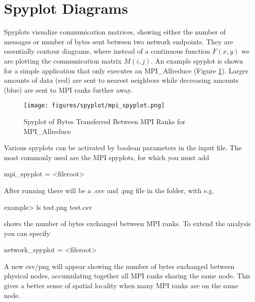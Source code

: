 

\section{Spyplot Diagrams}
\label{sec:tutorials:spyplot}

Spyplots visualize communication matrices, showing either the number of messages or number of bytes sent between two network endpoints.
They are essentially contour diagrams, where instead of a continuous function $F(x,y)$ we are plotting the communication matrix $M(i,j)$.
An example spyplot is shown for a simple application that only executes an MPI\_Allreduce (Figure \ref{fig:spyplot}).
Larger amounts of data (red) are sent to nearest neighbors while decreasing amounts (blue) are sent to MPI ranks further away.

\begin{figure}[h]
\centering
\texttt{[image: figures/spyplot/mpi\_spyplot.png]}
\caption{Spyplot of Bytes Transferred Between MPI Ranks for MPI\_Allreduce}
\label{fig:spyplot}
\end{figure}

Various spyplots can be activated by boolean parameters in the input file.
The most commonly used are the MPI spyplots, for which you must add

\begin{ViFile}
mpi_spyplot = <fileroot>
\end{ViFile}

After running there will be a .csv and .png file in the folder, with e.g. 

\begin{ShellCmd}
example> ls 
test.png
test.csv
\end{ShellCmd}
 shows the number of bytes exchanged between MPI ranks.
To extend the analysis you can specify

\begin{ViFile}
network_spyplot = <fileroot>
\end{ViFile}
A new csv/png will appear showing the number of bytes exchanged between physical nodes, 
accumulating together all MPI ranks sharing the same node.
This gives a better sense of spatial locality when many MPI ranks are on the same node.


